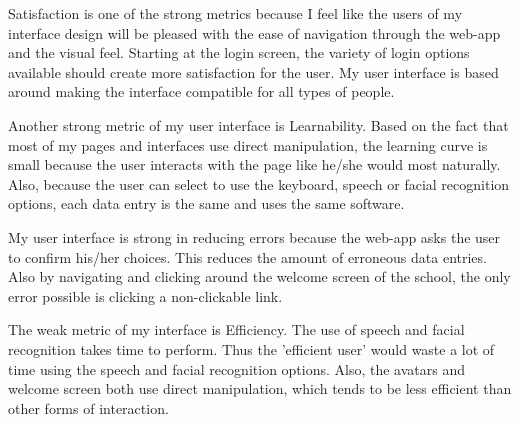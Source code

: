 \documentclass{article}
\begin{document}
Satisfaction is one of the strong metrics because I feel like the users of my interface design will be pleased with the ease of navigation through the web-app and the visual feel.  Starting at the login screen, the variety of login options available should create more satisfaction for the user.  My user interface is based around making the interface compatible for all types of people.  

Another strong metric of my user interface is Learnability.  Based on the fact that most of my pages and interfaces use direct manipulation, the learning curve is small because the user interacts with the page like he/she would most naturally.  Also, because the user can select to use the keyboard, speech or facial recognition options, each data entry is the same and uses the same software.  

My user interface is strong in reducing errors because the web-app asks the user to confirm his/her choices. This reduces the amount of erroneous data entries.  Also by navigating and clicking around the welcome screen of the school, the only error possible is clicking a non-clickable link.  

The weak metric of my interface is Efficiency.  The use of speech and facial recognition takes time to perform.  Thus the 'efficient user' would waste a lot of time using the speech and facial recognition options.  Also, the avatars and welcome screen both use direct manipulation, which tends to be less efficient than other forms of interaction.  




\end{document}
